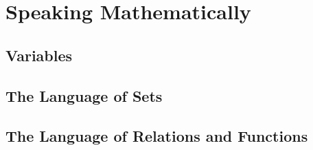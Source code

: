 \section{Speaking Mathematically}
\subsection{Variables}
\subsection{The Language of Sets}
\subsection{The Language of Relations and Functions}
